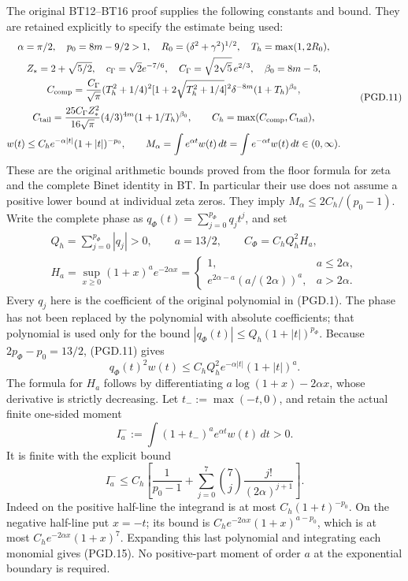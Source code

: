 The original BT12--BT16 proof supplies the following constants and
bound. They are retained explicitly to specify the estimate being used:
\[
 \begin{gathered}
 \alpha=\pi/2,\quad p_0=8m-9/2>1,\quad
 R_0=(\delta^2+\gamma^2)^{1/2},\quad T_h=\max(1,2R_0),\\
 Z_*=2+\sqrt{5/2},\quad
 c_\Gamma=\sqrt2e^{-7/6},\quad
 C_\Gamma=\sqrt{2\sqrt5}\,e^{2/3},\quad \beta_0=8m-5,\\
 C_{\rm comp}=\frac{C_\Gamma}{\sqrt\pi}(T_h^2+1/4)^2
       [1+2\sqrt{T_h^2+1/4}]^2
       \delta^{-8m}(1+T_h)^{\beta_0},\\
 C_{\rm tail}=\frac{25C_\Gamma Z_*^2}{16\sqrt\pi}
       (4/3)^{4m}(1+1/T_h)^{\beta_0},\qquad
 C_h=\max(C_{\rm comp},C_{\rm tail}),\\
 w(t)\leq C_he^{-\alpha|t|}(1+|t|)^{-p_0},\qquad
 M_\alpha=\int e^{\alpha t}w(t)\,dt
         =\int e^{-\alpha t}w(t)\,dt\in(0,\infty).
 \end{gathered}
 \tag{PGD.11}\label{GraphV2:eq:pgd-original-tail}
\]
These are the original arithmetic bounds proved from the floor formula
for zeta and the complete Binet identity in BT. In particular their
use does not assume a positive lower bound at individual zeta zeros.
They imply \(M_\alpha\leq2C_h/(p_0-1)\).
Write the complete phase as
\(q_\Phi(t)=\sum_{j=0}^{p_\Phi}q_jt^j\), and set
\[
 \begin{gathered}
 Q_h=\sum_{j=0}^{p_\Phi}|q_j|>0,\qquad
 a=13/2,\qquad C_\Phi=C_hQ_h^2H_a,\\
 H_a=\sup_{x\geq0}(1+x)^ae^{-2\alpha x}
  =\begin{cases}
      1,&a\leq2\alpha,\\
      e^{2\alpha-a}(a/(2\alpha))^a,&a>2\alpha.
    \end{cases}
 \end{gathered}
 \tag{PGD.12}\label{GraphV2:eq:pgd-phase-constants}
\]
Every \(q_j\) here is the coefficient of the original polynomial in
(PGD.1). The phase has not been replaced by the polynomial with
absolute coefficients; that polynomial is used only for the bound
\(|q_\Phi(t)|\leq Q_h(1+|t|)^{p_\Phi}\).
Because \(2p_\Phi-p_0=13/2\), (PGD.11) gives
\[
 q_\Phi(t)^2w(t)
       \leq C_hQ_h^2e^{-\alpha|t|}(1+|t|)^a.
 \tag{PGD.13}\label{GraphV2:eq:pgd-inserted-tail}
\]
The formula for \(H_a\) follows by differentiating
\(a\log(1+x)-2\alpha x\), whose derivative is strictly decreasing.
Let \(t_-:=\max(-t,0)\), and retain the actual finite one-sided moment
\[
 I_a^-:=\int (1+t_-)^ae^{\alpha t}w(t)\,dt>0.
 \tag{PGD.14}\label{GraphV2:eq:pgd-negative-moment}
\]
It is finite with the explicit bound
\[
 I_a^-\leq C_h\left[
       \frac1{p_0-1}
       +\sum_{j=0}^{7}\binom7j\frac{j!}{(2\alpha)^{j+1}}
                           \right].
 \tag{PGD.15}\label{GraphV2:eq:pgd-negative-moment-bound}
\]
Indeed on the positive half-line the integrand is at most
\(C_h(1+t)^{-p_0}\). On the negative half-line put \(x=-t\);
its bound is \(C_he^{-2\alpha x}(1+x)^{a-p_0}\), which is at
most \(C_he^{-2\alpha x}(1+x)^7\). Expanding this last polynomial
and integrating each monomial gives (PGD.15). No positive-part
moment of order \(a\) at the exponential boundary is required.

